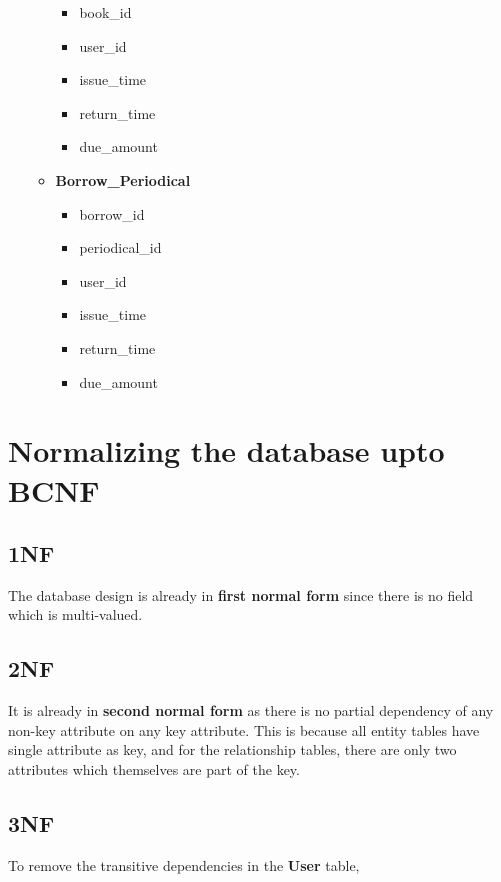 \documentclass{article}
\begin{document}
\begin{itemize}
\begin{itemize}
\begin{itemize}
                    \item {\color{red}book\_id}
                    \item {\color{red}user\_id}
                    \item issue\_time
                    \item return\_time
                    \item due\_amount
                \end{itemize}
            \item \textbf{{\color{green}Borrow\_Periodical}}
                \begin{itemize}
                    \item {\color{blue}borrow\_id}
                    \item {\color{red}periodical\_id}
                    \item {\color{red}user\_id}
                    \item issue\_time
                    \item return\_time
                    \item due\_amount
                \end{itemize}
        \end{itemize}
\end{itemize}

\section{Normalizing the database upto BCNF}
\subsection{1NF} The database design is already in \textbf{first normal form} since there is no field which is multi-valued.
\subsection{2NF} It is already in \textbf{second normal form} as there is no partial dependency of any non-key attribute on any key attribute. This is because all entity tables have single attribute as key, and for the relationship tables, there are only two attributes which themselves are part of the key.
\subsection{3NF} To remove the transitive dependencies in the \textbf{User} table, 
\end{document}
